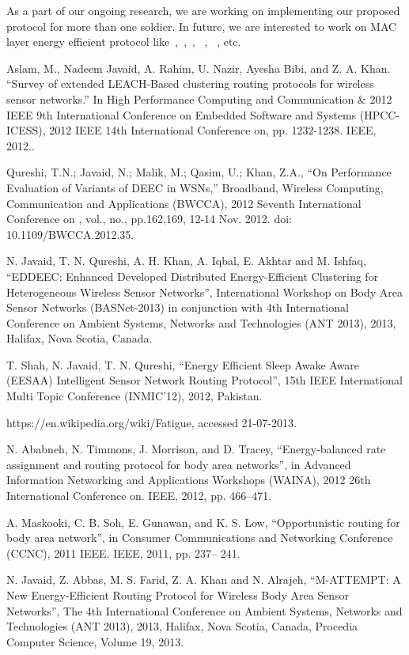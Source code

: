 \documentclass[journal]{IEEEtran}
\begin{document}
As a part of our ongoing research, we are working on implementing our proposed protocol for more than one soldier. In future,
we are interested to work on MAC layer energy efficient protocol like~\cite{17},~\cite{18},~\cite{19}, ~\cite{20}, ~\cite{21}, etc.


\begin{thebibliography}{1}
Aslam, M., Nadeem Javaid, A. Rahim, U. Nazir, Ayesha Bibi, and Z. A. Khan. ``Survey of extended LEACH-Based clustering routing protocols for wireless sensor networks.'' In High Performance Computing and Communication \& 2012 IEEE 9th International Conference on Embedded Software and Systems (HPCC-ICESS), 2012 IEEE 14th International Conference on, pp. 1232-1238. IEEE, 2012..

Qureshi, T.N.; Javaid, N.; Malik, M.; Qasim, U.; Khan, Z.A., ``On Performance Evaluation of Variants of DEEC in WSNs,'' Broadband, Wireless Computing, Communication and Applications (BWCCA), 2012 Seventh International Conference on , vol., no., pp.162,169, 12-14 Nov. 2012. doi: 10.1109/BWCCA.2012.35.

N. Javaid, T. N. Qureshi, A. H. Khan, A. Iqbal, E. Akhtar and M. Ishfaq, ``EDDEEC: Enhanced Developed
 Distributed Energy-Efficient Clustering for Heterogeneous Wireless Sensor Networks'', International
Workshop on Body Area Sensor Networks (BASNet-2013) in conjunction with 4th International Conference on
Ambient Systems, Networks and Technologies (ANT 2013), 2013, Halifax, Nova Scotia, Canada.

T. Shah, N. Javaid, T. N. Qureshi, ``Energy Efficient Sleep Awake Aware (EESAA) Intelligent Sensor Network Routing Protocol'', 15th IEEE International Multi Topic Conference (INMIC'12), 2012, Pakistan.

https://en.wikipedia.org/wiki/Fatigue, accessed 21-07-2013.

N. Ababneh, N. Timmons, J. Morrison, and D. Tracey, ``Energy-balanced
rate assignment and routing protocol for body area networks'', in Advanced Information Networking and Applications Workshops (WAINA),
2012 26th International Conference on. IEEE, 2012, pp. 466–471.

A. Maskooki, C. B. Soh, E. Gunawan, and K. S. Low, ``Opportunistic
routing for body area network'', in Consumer Communications and
Networking Conference (CCNC), 2011 IEEE. IEEE, 2011, pp. 237–
241.

N. Javaid, Z. Abbas, M. S. Farid, Z. A. Khan and N. Alrajeh, ``M-ATTEMPT: A New Energy-Efficient Routing Protocol for Wireless Body Area Sensor Networks'', The 4th International Conference on Ambient Systems, Networks and Technologies (ANT 2013), 2013, Halifax, Nova Scotia, Canada, Procedia Computer Science, Volume 19, 2013.


\end{thebibliography}
\end{document}
